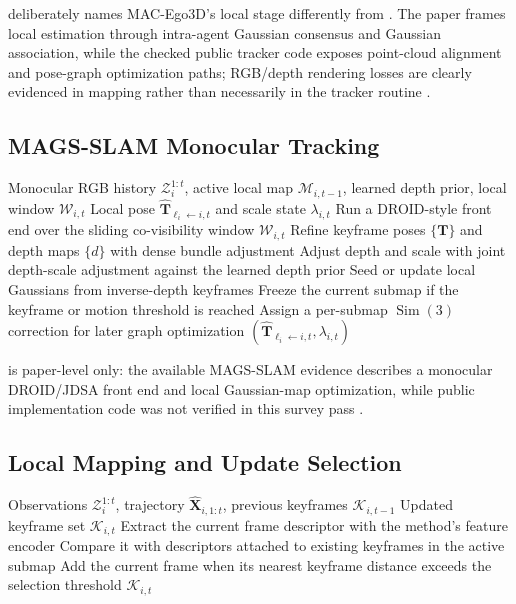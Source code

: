 \documentclass[11pt, a4paper, logo]{googledeepmind}
\begin{document}
 deliberately names MAC-Ego3D's local stage differently from . The paper frames local estimation through intra-agent Gaussian consensus and Gaussian association, while the checked public tracker code exposes point-cloud alignment and pose-graph optimization paths; RGB/depth rendering losses are clearly evidenced in mapping rather than necessarily in the tracker routine \citep{xu2024mac_ego3d}.

\subsection{MAGS-SLAM Monocular Tracking}

\begin{algorithm}[H]
\caption{MAGS-SLAM monocular local tracking}
\label{alg:app-mags-monocular-tracking}
\small
\begin{algorithmic}[1]
  \Require Monocular RGB history $\mathcal{Z}_i^{1:t}$, active local map $\mathcal{M}_{i,t-1}$, learned depth prior, local window $\mathcal{W}_{i,t}$
  \Ensure Local pose $\hat{\mathbf{T}}_{\ell_i\leftarrow i,t}$ and scale state $\lambda_{i,t}$
  \State Run a DROID-style front end over the sliding co-visibility window $\mathcal{W}_{i,t}$
  \State Refine keyframe poses $\{\mathbf{T}\}$ and depth maps $\{d\}$ with dense bundle adjustment
  \State Adjust depth and scale with joint depth-scale adjustment against the learned depth prior
  \State Seed or update local Gaussians from inverse-depth keyframes
  \State Freeze the current submap if the keyframe or motion threshold is reached
  \State Assign a per-submap $\operatorname{Sim}(3)$ correction for later graph optimization
  \State \Return $(\hat{\mathbf{T}}_{\ell_i\leftarrow i,t},\lambda_{i,t})$
\end{algorithmic}
\end{algorithm}

 is paper-level only: the available MAGS-SLAM evidence describes a monocular DROID/JDSA front end and local Gaussian-map optimization, while public implementation code was not verified in this survey pass \citep{cao2026mags_slam}.

\subsection{Local Mapping and Update Selection}

\begin{algorithm}[H]
\caption{CoKo-SLAM keyframe selection}
\label{alg:app-coko-keyframe-selection}
\small
\begin{algorithmic}[1]
  \Require Observations $\mathcal{Z}_i^{1:t}$, trajectory $\hat{\mathbf{X}}_{i,1:t}$, previous keyframes $\mathcal{K}_{i,t-1}$
  \Ensure Updated keyframe set $\mathcal{K}_{i,t}$
  \State Extract the current frame descriptor with the method's feature encoder
  \State Compare it with descriptors attached to existing keyframes in the active submap
  \State Add the current frame when its nearest keyframe distance exceeds the selection threshold
  \State \Return $\mathcal{K}_{i,t}$
\end{algorithmic}
\end{algorithm}
\end{document}
